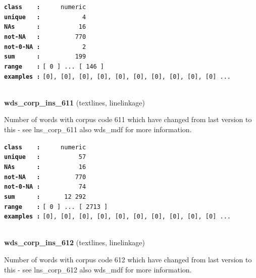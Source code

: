 \documentclass[]{article}
\begin{document}
\textbf{\texttt{class\ \ \ \ :}} \texttt{~~~~~numeric}\\
\textbf{\texttt{unique\ \ \ :}} \texttt{~~~~~~~~~~~4}\\
\textbf{\texttt{NAs\ \ \ \ \ \ :}} \texttt{~~~~~~~~~~16}\\
\textbf{\texttt{not-NA\ \ \ :}} \texttt{~~~~~~~~~770}\\
\textbf{\texttt{not-0-NA\ :}} \texttt{~~~~~~~~~~~2}\\
\textbf{\texttt{sum\ \ \ \ \ \ :}} \texttt{~~~~~~~~~199}\\
\textbf{\texttt{range\ \ \ \ :}}
\texttt{{[}\ 0\ {]}\ ...\ {[}\ 146\ {]}}\\
\textbf{\texttt{examples\ :}}
\texttt{{[}0{]},\ {[}0{]},\ {[}0{]},\ {[}0{]},\ {[}0{]},\ {[}0{]},\ {[}0{]},\ {[}0{]},\ {[}0{]},\ {[}0{]}\ ...}\\

~

\textbf{wds\_corp\_ins\_611} (textlines, linelinkage)

Number of words with corpus code 611 which have changed from last
version to this - see lns\_corp\_611 also wds\_mdf for more information.

\textbf{\texttt{class\ \ \ \ :}} \texttt{~~~~~numeric}\\
\textbf{\texttt{unique\ \ \ :}} \texttt{~~~~~~~~~~57}\\
\textbf{\texttt{NAs\ \ \ \ \ \ :}} \texttt{~~~~~~~~~~16}\\
\textbf{\texttt{not-NA\ \ \ :}} \texttt{~~~~~~~~~770}\\
\textbf{\texttt{not-0-NA\ :}} \texttt{~~~~~~~~~~74}\\
\textbf{\texttt{sum\ \ \ \ \ \ :}} \texttt{~~~~~~12~292}\\
\textbf{\texttt{range\ \ \ \ :}}
\texttt{{[}\ 0\ {]}\ ...\ {[}\ 2713\ {]}}\\
\textbf{\texttt{examples\ :}}
\texttt{{[}0{]},\ {[}0{]},\ {[}0{]},\ {[}0{]},\ {[}0{]},\ {[}0{]},\ {[}0{]},\ {[}0{]},\ {[}0{]},\ {[}0{]}\ ...}\\

~

\textbf{wds\_corp\_ins\_612} (textlines, linelinkage)

Number of words with corpus code 612 which have changed from last
version to this - see lns\_corp\_612 also wds\_mdf for more information.
\end{document}
